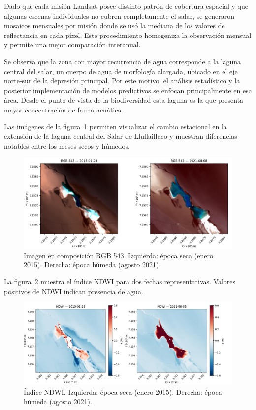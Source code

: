 Dado que cada misión Landsat posee distinto patrón de cobertura espacial y que algunas escenas individuales no cubren completamente el salar, se generaron mosaicos mensuales por misión donde se usó la mediana de los valores de reflectancia en cada píxel. Este procedimiento homogeniza la observación mensual y permite una mejor comparación interanual.


Se observa que la zona con mayor recurrencia de agua corresponde a la laguna central del salar, un cuerpo de agua de morfología alargada, ubicado en el eje norte-sur de la depresión principal. Por este motivo, el análisis estadístico y la posterior implementación de modelos predictivos se enfocan principalmente en esa área. Desde el punto de vista de la biodiversidad esta laguna es la que presenta mayor concentración de fauna acuática.

Las imágenes de la figura~\ref{fig:epoca_seca_hum} permiten visualizar el cambio estacional en la extensión de la laguna central del Salar de Llullaillaco y muestran diferencias notables entre los meses secos y húmedos.


\begin{figure}[ht]
        \centering
        \includegraphics[scale=.34]
        {Figures/rbg_cap3_a.png}
        \caption{Imagen en composición RGB 543. Izquierda: época seca (enero 2015). Derecha: época húmeda (agosto 2021).}
        \label{fig:epoca_seca_hum}
\end{figure}


La figura~\ref{fig:ndwi_seco_hum} muestra el índice NDWI para dos fechas representativas. Valores positivos de NDWI indican presencia de agua.


\begin{figure}[ht]
        \centering
        \includegraphics[scale=.33]
        {Figures/rgb_cap3_b.png}
        \caption{Índice NDWI. Izquierda: época seca (enero 2015). Derecha: época húmeda (agosto 2021).}
        \label{fig:ndwi_seco_hum}
\end{figure}


